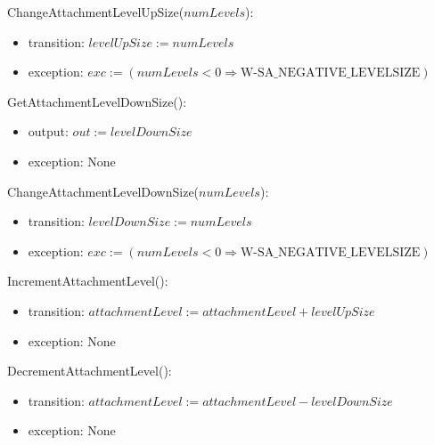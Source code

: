 \noindent ChangeAttachmentLevelUpSize($\mathit{numLevels}$):
\begin{itemize}

    \item transition: $\mathit{levelUpSize} := \mathit{numLevels} $

    \item exception: $exc := ( \mathit{numLevels} < 0 \Rightarrow
    \text{W-SA\_NEGATIVE\_LEVELSIZE} )$

\end{itemize}

\noindent GetAttachmentLevelDownSize():
\begin{itemize}

    \item output: $out := \mathit{levelDownSize} $

    \item exception: None

\end{itemize}

\noindent ChangeAttachmentLevelDownSize($\mathit{numLevels}$):
\begin{itemize}

    \item transition: $\mathit{levelDownSize} := \mathit{numLevels} $

    \item exception: $exc := ( \mathit{numLevels} < 0 \Rightarrow
    \text{W-SA\_NEGATIVE\_LEVELSIZE} )$

\end{itemize}

\noindent IncrementAttachmentLevel():
\begin{itemize}

    \item transition: $\mathit{attachmentLevel} :=
    \mathit{attachmentLevel} + \mathit{levelUpSize} $

    \item exception: None

\end{itemize}

\noindent DecrementAttachmentLevel():
\begin{itemize}

    \item transition: $\mathit{attachmentLevel} :=
    \mathit{attachmentLevel} - \mathit{levelDownSize} $

    \item exception: None

\end{itemize}

